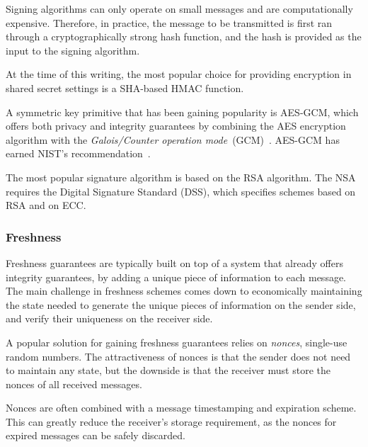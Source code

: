 Signing algorithms can only operate on small messages and are computationally
expensive. Therefore, in practice, the message to be transmitted is first ran
through a cryptographically strong hash function, and the hash is provided as
the input to the signing algorithm.

At the time of this writing, the most popular choice for providing encryption
in shared secret settings is a SHA-based HMAC function.

A symmetric key primitive that has been gaining popularity is AES-GCM, which
offers both privacy and integrity guarantees by combining the AES encryption
algorithm with the \textit{Galois/Counter operation
mode}~(GCM)~\cite{mcgrew2004gcm}. AES-GCM has earned NIST's
recommendation~\cite{fips2017gcm}.

The most popular signature algorithm is based on the RSA algorithm. The NSA
requires the Digital Signature Standard (DSS)\cite{fips2013dss}, which
specifies schemes based on RSA and on ECC.


\subsubsection{Freshness}

Freshness guarantees are typically built on top of a system that already offers
integrity guarantees, by adding a unique piece of information to each message.
The main challenge in freshness schemes comes down to economically maintaining
the state needed to generate the unique pieces of information on the sender
side, and verify their uniqueness on the receiver side.

A popular solution for gaining freshness guarantees relies on \textit{nonces},
single-use random numbers. The attractiveness of nonces is that the sender does
not need to maintain any state, but the downside is that the receiver must
store the nonces of all received messages.

Nonces are often combined with a message timestamping and expiration scheme.
This can greatly reduce the receiver's storage requirement, as the nonces for
expired messages can be safely discarded.

